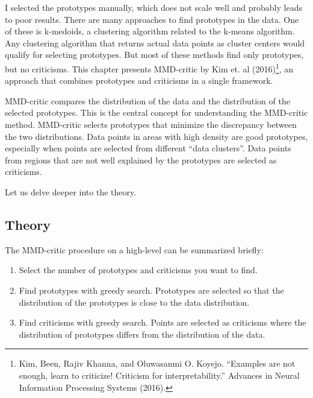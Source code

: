 \documentclass[12pt,]{krantz}
\providecommand{\tightlist}{%
  \setlength{\itemsep}{0pt}\setlength{\parskip}{0pt}}
\begin{document}
I selected the prototypes manually, which does not scale well and
probably leads to poor results. There are many approaches to find
prototypes in the data. One of these is k-medoids, a clustering
algorithm related to the k-means algorithm. Any clustering algorithm
that returns actual data points as cluster centers would qualify for
selecting prototypes. But most of these methods find only prototypes,
but no criticisms. This chapter presents MMD-critic by Kim et. al
(2016)\footnote{Kim, Been, Rajiv Khanna, and Oluwasanmi O. Koyejo.
  ``Examples are not enough, learn to criticize! Criticism for
  interpretability.'' Advances in Neural Information Processing Systems
  (2016).}, an approach that combines prototypes and criticisms in a
single framework.

MMD-critic compares the distribution of the data and the distribution of
the selected prototypes. This is the central concept for understanding
the MMD-critic method. MMD-critic selects prototypes that minimize the
discrepancy between the two distributions. Data points in areas with
high density are good prototypes, especially when points are selected
from different ``data clusters''. Data points from regions that are not
well explained by the prototypes are selected as criticisms.

Let us delve deeper into the theory.

\subsection{Theory}\label{theory-5}

The MMD-critic procedure on a high-level can be summarized briefly:

\begin{enumerate}
\def\labelenumi{\arabic{enumi}.}
\tightlist
\item
  Select the number of prototypes and criticisms you want to find.
\item
  Find prototypes with greedy search. Prototypes are selected so that
  the distribution of the prototypes is close to the data distribution.
\item
  Find criticisms with greedy search. Points are selected as criticisms
  where the distribution of prototypes differs from the distribution of
  the data.
\end{enumerate}
\end{document}
